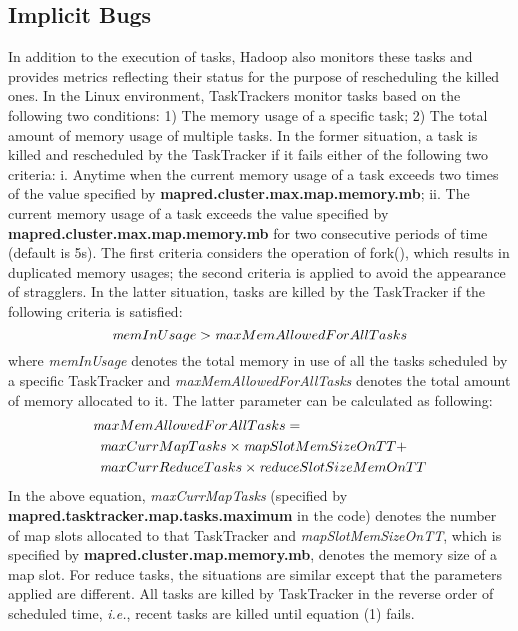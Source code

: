 \subsection{Implicit Bugs}
In addition to the execution of tasks, Hadoop also monitors these tasks and provides metrics reflecting their status for the purpose of rescheduling the killed ones.
In the Linux environment, TaskTrackers monitor tasks based on the following two conditions:  1) The memory usage of a specific task; 2) The total amount of memory usage of multiple tasks.
In the former situation, a task is killed and rescheduled by the TaskTracker if it fails either of the following two criteria:
i. Anytime when the current memory usage of a task exceeds two times of the value specified by {\bf mapred.cluster.max.map.memory.mb};
ii. The current memory usage of a task exceeds the value specified by {\bf mapred.cluster.max.map.memory.mb} for two consecutive periods of time (default is 5s). 
The first criteria considers the operation of fork(), which results in duplicated memory usages; the second criteria is applied to avoid the appearance of stragglers.
In the latter situation, tasks are killed by the TaskTracker if the following criteria is satisfied:
\begin{equation}
{\emph memInUsage} > {\emph maxMemAllowedForAllTasks} 
\end{equation}
where \emph {memInUsage} denotes the total memory in use of all the tasks scheduled by a specific TaskTracker and \emph {maxMemAllowedForAllTasks} denotes the total amount of memory allocated to it. The latter parameter can be calculated as following:
\begin{equation*}
\begin{aligned}
&{\emph maxMemAllowedForAllTasks} = \\
& \hspace {5pt} {\emph maxCurrMapTasks} \times {\emph mapSlotMemSizeOnTT} + \\
& \hspace {5pt} {\emph maxCurrReduceTasks} \times {\emph reduceSlotSizeMemOnTT}
\end{aligned}
\end{equation*}
In the above equation, \emph {maxCurrMapTasks} (specified by {\bf mapred.tasktracker.map.tasks.maximum} in the code) denotes the number of map slots allocated to that TaskTracker and \emph {mapSlotMemSizeOnTT}, which is specified by {\bf mapred.cluster.map.memory.mb}, denotes the memory size of a map slot. 
For reduce tasks, the situations are similar except that the parameters applied are different.
All tasks are killed by TaskTracker in the reverse order of scheduled time, \emph{i.e.}, recent tasks are killed until equation (1) fails. 
\par

